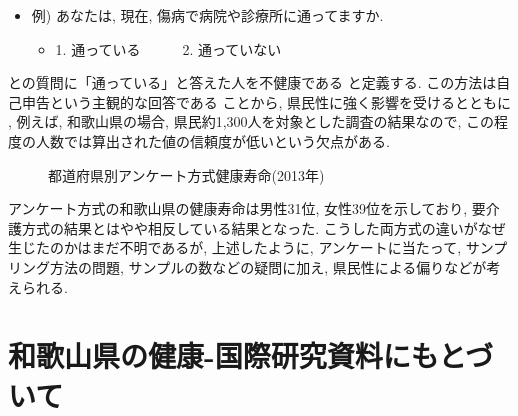 \begin{itemize} \setlength{\itemsep}{-0.5mm} \setlength{\parskip}{-0.5mm}
	\item  例) あなたは, 現在, 傷病で病院や診療所に通ってますか.
	      \begin{itemize} \setlength{\itemsep}{-0.5mm} \setlength{\parskip}{-0.5mm}
		      \item 1. 通っている~~~~~~2. 通っていない
	      \end{itemize}
\end{itemize}
との質問に「通っている」と答えた人を不健康である
と定義する.
この方法は自己申告という主観的な回答である
ことから, 県民性に強く影響を受けるとともに
, 例えば, 和歌山県の場合, 県民約1,300人を対象とした調査の結果なので, この程度の人数では算出された値の信頼度が低いという欠点がある.

\begin{figure}[h!]
	\begin{center}
		\caption{都道府県別アンケート方式健康寿命(2013年)}\label{fig1}
	\end{center}
\end{figure}

アンケート方式の和歌山県の健康寿命は男性31位, 女性39位を示しており, 要介護方式の結果とはやや相反している結果となった.
こうした両方式の違いがなぜ生じたのかはまだ不明であるが, 上述したように, アンケートに当たって, サンプリング方法の問題,
サンプルの数などの疑問に加え, 県民性による偏りなどが考えられる.
\section{和歌山県の健康-国際研究資料にもとづいて}



%
%
%



